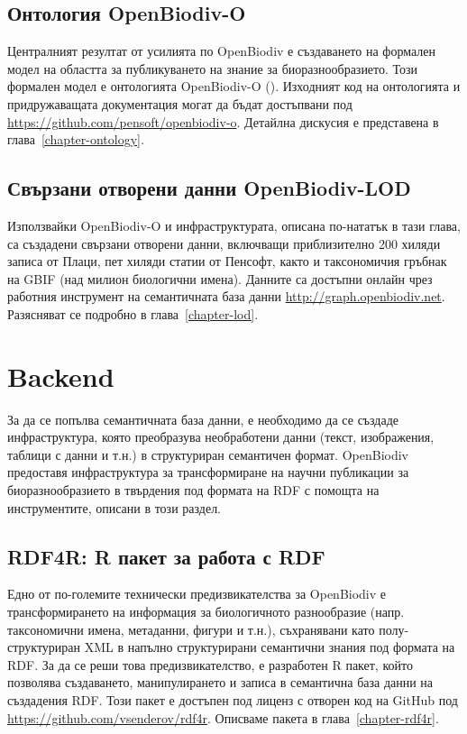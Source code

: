 \subsection{Онтология OpenBiodiv-O}

Централният резултат от усилията по OpenBiodiv е създаването на формален модел на областта за публикуването на знание за биоразнообразието. Този формален модел е онтологията OpenBiodiv-O (\cite{senderov_openbiodiv_2017}). Изходният код на онтологията и придружаващата документация могат да бъдат достъпвани под \url{https://github.com/pensoft/openbiodiv-o}. Детайлна дискусия е представена в глава~\ref{chapter-ontology}.

\subsection{Свързани отворени данни OpenBiodiv-LOD }

Използвайки OpenBiodiv-O и инфраструктурата, описана по-нататък в тази глава, са създадени свързани отворени данни, включващи приблизително 200 хиляди записа от Плаци, пет хиляди статии от Пенсофт, както и таксономичия гръбнак на GBIF (над милион биологични имена). Данните са достъпни онлайн чрез работния инструмент на семантичната база данни \url{http://graph.openbiodiv.net}. Разясняват се подробно в глава~\ref {chapter-lod}.

\section{Backend}

За да се попълва семантичната база данни, е необходимо да се създаде инфраструктура, която преобразува необработени данни (текст, изображения, таблици с данни и т.н.) в структуриран семантичен формат. OpenBiodiv предоставя инфраструктура за трансформиране на научни публикации за биоразнообразието в твърдения под формата на RDF с помощта на инструментите, описани в този раздел.

\subsection{RDF4R: R пакет за работа с RDF}

Едно от по-големите технически предизвикателства за OpenBiodiv е трансформирането на информация за биологичното разнообразие (напр. таксономични имена, метаданни, фигури и т.н.), съхранявани като полу-структуриран XML в напълно структурирани семантични знания под формата на RDF. За да се реши това предизвикателство, е разработен R пакет, който позволява създаването, манипулирането и записа в семантична база данни на създадения RDF. Този пакет е достъпен под лиценз с отворен код на GitHub под \url{https://github.com/vsenderov/rdf4r}. Описваме пакета в глава~\ref{chapter-rdf4r}.

